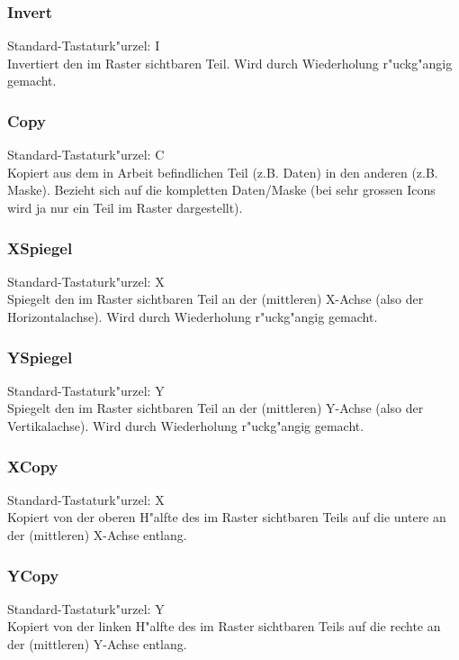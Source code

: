 \subsubsection{Invert}
Standard-Tastaturk"urzel: I \\ 
Invertiert den im Raster sichtbaren Teil. 
Wird durch Wiederholung r"uckg"angig gemacht.

\subsubsection{Copy}
Standard-Tastaturk"urzel: C \\  
Kopiert aus dem in Arbeit befindlichen Teil 
(z.B. Daten) in den anderen (z.B. Maske).
Bezieht sich auf die kompletten Daten/Maske (bei sehr grossen
Icons wird ja nur ein Teil im Raster dargestellt).

\subsubsection{XSpiegel}
Standard-Tastaturk"urzel: X \\
 
Spiegelt den im Raster sichtbaren Teil an der (mittleren) X-Achse
(also der Horizontalachse).
Wird durch Wiederholung r"uckg"angig gemacht.

\subsubsection{YSpiegel}
Standard-Tastaturk"urzel: Y \\
 
Spiegelt den im Raster sichtbaren Teil an der (mittleren) Y-Achse
(also der Vertikalachse).
Wird durch Wiederholung r"uckg"angig gemacht.

\subsubsection{XCopy}
Standard-Tastaturk"urzel: {\control}X \\
 
Kopiert von der oberen H"alfte des im Raster sichtbaren Teils
auf die untere an der (mittleren) X-Achse entlang.

\subsubsection{YCopy}
Standard-Tastaturk"urzel: {\control}Y \\
 
Kopiert von der linken H"alfte des im Raster sichtbaren Teils
auf die rechte an der (mittleren) Y-Achse entlang.

